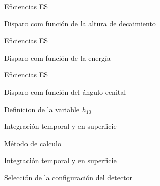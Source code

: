 \begin{frame}{Eficiencias ES}
	\begin{block}{Disparo com funci\'on de la altura de decaimiento}
		\begin{center}
		\end{center}
	\end{block}
\end{frame}

\begin{frame}{Eficiencias ES}
	\begin{block}{Disparo com funci\'on de la energ\'ia}
		\begin{center}
		\end{center}
	\end{block}
\end{frame}

\begin{frame}{Eficiencias ES}
\footnotesize
	\begin{block}{Disparo com funci\'on del \'angulo cenital}
		\begin{center}
		\hspace{1mm}
		\end{center}
	\end{block}
	\begin{block}{Definicion de la variable $h_{10}$}
		\begin{center}
		\end{center}
	\end{block}
\end{frame}

\begin{frame}{Integraci\'on temporal y en superficie}
	\begin{block}{M\'etodo de calculo}
		\begin{center}
		\end{center}
	\end{block}
\end{frame}

\begin{frame}{Integraci\'on temporal y en superficie}
	\begin{block}{Selecci\'on de la configuraci\'on del detector}
		\begin{center}
		\end{center}
	\end{block}
\end{frame}


